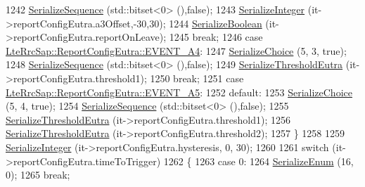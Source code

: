 \begin{DoxyCode}
1242                   \hyperlink{classns3_1_1Asn1Header_aa9744858380443ed95836fed08799aed}{SerializeSequence} (std::bitset<0> (),\textcolor{keyword}{false});
1243                   \hyperlink{classns3_1_1Asn1Header_ab1c3bd37730affa7473bc759d625c29a}{SerializeInteger} (it->reportConfigEutra.a3Offset,-30,30);
1244                   \hyperlink{classns3_1_1Asn1Header_a28e3626acdffec71c0376f4f3e7e7ec4}{SerializeBoolean} (it->reportConfigEutra.reportOnLeave);
1245                   \textcolor{keywordflow}{break};
1246                 \textcolor{keywordflow}{case} \hyperlink{structns3_1_1LteRrcSap_1_1ReportConfigEutra_ab8152dc095987f60bee2e9115046902fa6b8e5f5e5eea05c9441816bd32aaf6c0}{LteRrcSap::ReportConfigEutra::EVENT\_A4}:
1247                   \hyperlink{classns3_1_1Asn1Header_a400ef4a710499da80fc55e23a973d4fa}{SerializeChoice} (5, 3, \textcolor{keyword}{true});
1248                   \hyperlink{classns3_1_1Asn1Header_aa9744858380443ed95836fed08799aed}{SerializeSequence} (std::bitset<0> (),\textcolor{keyword}{false});
1249                   \hyperlink{classns3_1_1RrcAsn1Header_ab2402f89c75f446c4a06beb1e7a6fed6}{SerializeThresholdEutra} (it->reportConfigEutra.threshold1);
1250                   \textcolor{keywordflow}{break};
1251                 \textcolor{keywordflow}{case} \hyperlink{structns3_1_1LteRrcSap_1_1ReportConfigEutra_ab8152dc095987f60bee2e9115046902fae92d8c286b3b1a6e39edc844df72588c}{LteRrcSap::ReportConfigEutra::EVENT\_A5}:
1252                 \textcolor{keywordflow}{default}:
1253                   \hyperlink{classns3_1_1Asn1Header_a400ef4a710499da80fc55e23a973d4fa}{SerializeChoice} (5, 4, \textcolor{keyword}{true});
1254                   \hyperlink{classns3_1_1Asn1Header_aa9744858380443ed95836fed08799aed}{SerializeSequence} (std::bitset<0> (),\textcolor{keyword}{false});
1255                   \hyperlink{classns3_1_1RrcAsn1Header_ab2402f89c75f446c4a06beb1e7a6fed6}{SerializeThresholdEutra} (it->reportConfigEutra.threshold1);
1256                   \hyperlink{classns3_1_1RrcAsn1Header_ab2402f89c75f446c4a06beb1e7a6fed6}{SerializeThresholdEutra} (it->reportConfigEutra.threshold2);
1257                 \}
1258 
1259               \hyperlink{classns3_1_1Asn1Header_ab1c3bd37730affa7473bc759d625c29a}{SerializeInteger} (it->reportConfigEutra.hysteresis, 0, 30);
1260 
1261               \textcolor{keywordflow}{switch} (it->reportConfigEutra.timeToTrigger)
1262                 \{
1263                 \textcolor{keywordflow}{case} 0:
1264                   \hyperlink{classns3_1_1Asn1Header_ac8e56956823ab8e4470c09e162e7bf24}{SerializeEnum} (16, 0);
1265                   \textcolor{keywordflow}{break};

\end{DoxyCode}
